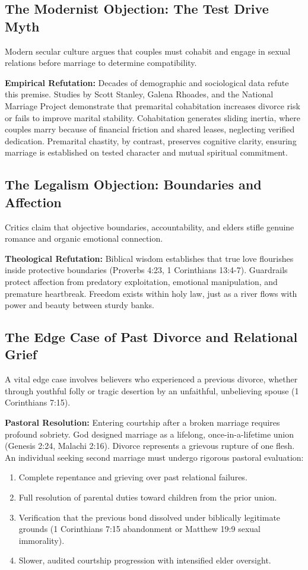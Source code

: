 \documentclass[11pt,twocolumn]{article}
\begin{document}
\subsection{The Modernist Objection: The Test Drive Myth}
Modern secular culture argues that couples must cohabit and engage in sexual relations before marriage to determine compatibility. 

\noindent\textbf{Empirical Refutation:} Decades of demographic and sociological data refute this premise. Studies by Scott Stanley, Galena Rhoades, and the National Marriage Project demonstrate that premarital cohabitation increases divorce risk or fails to improve marital stability. Cohabitation generates sliding inertia, where couples marry because of financial friction and shared leases, neglecting verified dedication. Premarital chastity, by contrast, preserves cognitive clarity, ensuring marriage is established on tested character and mutual spiritual commitment.

\subsection{The Legalism Objection: Boundaries and Affection}
Critics claim that objective boundaries, accountability, and elders stifle genuine romance and organic emotional connection.

\noindent\textbf{Theological Refutation:} Biblical wisdom establishes that true love flourishes inside protective boundaries (Proverbs 4:23, 1 Corinthians 13:4-7). Guardrails protect affection from predatory exploitation, emotional manipulation, and premature heartbreak. Freedom exists within holy law, just as a river flows with power and beauty between sturdy banks.

\subsection{The Edge Case of Past Divorce and Relational Grief}
A vital edge case involves believers who experienced a previous divorce, whether through youthful folly or tragic desertion by an unfaithful, unbelieving spouse (1 Corinthians 7:15).

\noindent\textbf{Pastoral Resolution:} Entering courtship after a broken marriage requires profound sobriety. God designed marriage as a lifelong, once-in-a-lifetime union (Genesis 2:24, Malachi 2:16). Divorce represents a grievous rupture of one flesh. An individual seeking second marriage must undergo rigorous pastoral evaluation:
\begin{enumerate}
    \item Complete repentance and grieving over past relational failures.
    \item Full resolution of parental duties toward children from the prior union.
    \item Verification that the previous bond dissolved under biblically legitimate grounds (1 Corinthians 7:15 abandonment or Matthew 19:9 sexual immorality).
    \item Slower, audited courtship progression with intensified elder oversight.
\end{enumerate}
\end{document}
